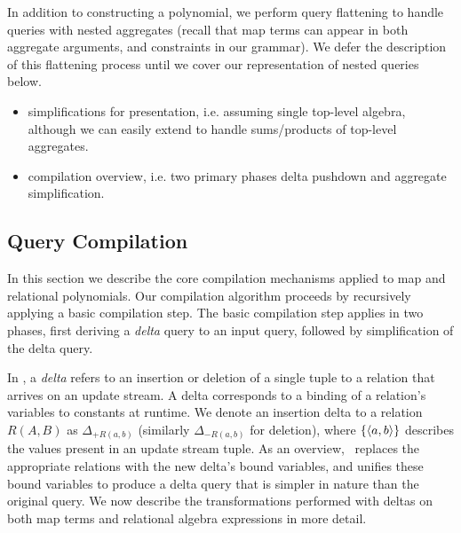 In addition to constructing a polynomial, we perform query flattening to handle
queries with nested aggregates (recall that map terms can appear in both
aggregate arguments, and constraints in our grammar). We defer the description
of this flattening process until we cover our representation of nested queries
below.

\begin{itemize}
\item simplifications for presentation, i.e. assuming single top-level
  algebra, although we can easily extend to handle sums/products of top-level
  aggregates.
\item compilation overview, i.e. two primary phases delta pushdown and
  aggregate simplification.
\end{itemize}

\subsection{Query Compilation}
In this section we describe the core compilation mechanisms applied to map and
relational polynomials. Our compilation algorithm proceeds by recursively
applying a basic compilation step. The basic compilation step applies in two
phases, first deriving a \textit{delta} query to an input query, followed by
simplification of the delta query. 

In \compiler, a \textit{delta} refers to an insertion or deletion of a single
tuple to a relation that arrives on an update stream. A delta corresponds to a
binding of a relation's variables to constants at runtime. We denote an
insertion delta to a relation $R(A,B)$ as $\Delta_{+R(a,b)}$ (similarly
$\Delta_{-R(a,b)}$ for deletion), where $\{{\langle a,b\rangle}\}$ describes the values
present in an update stream tuple. As an overview, \compiler\ replaces the
appropriate relations with the new delta's bound variables, and unifies these
bound variables to produce a delta query that is simpler in nature than the
original query.
We now describe the transformations performed with deltas on
both map terms and relational algebra expressions in more detail.

